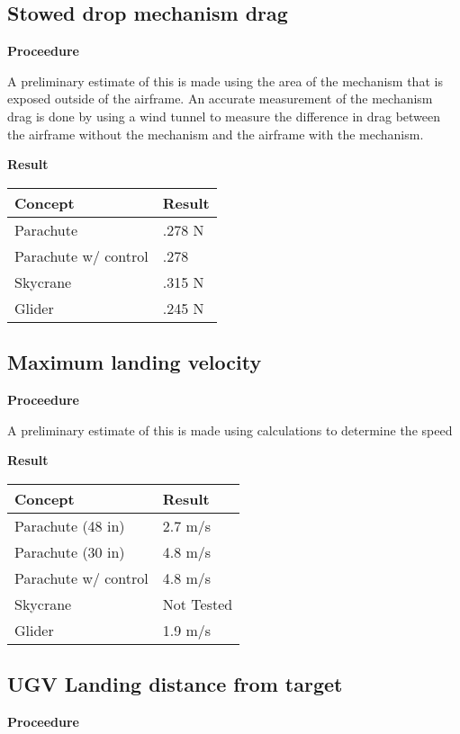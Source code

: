 \documentclass[]{auvsi_doc}
\begin{document}
	\subsection{Stowed drop mechanism drag}                                   
	\textbf{Proceedure}

	A preliminary estimate of this is made using the area of the mechanism that is exposed outside of the airframe. 
	An accurate measurement of the mechanism drag is done by using a wind tunnel to measure the difference in drag between the airframe without the mechanism and the airframe with the mechanism.
	
	\textbf{Result}
	
	\begin{tabular}{|l|l|}
		\hline
		\textbf{Concept}       & \textbf{Result} \\
		\hline
		Parachute              &         .278 N        \\
		Parachute w/ control   &    .278             \\
		Skycrane               &        .315 N         \\
		Glider                 &		.245 N		 \\
		\hline
	\end{tabular}

	\subsection{Maximum landing velocity}
	\textbf{Proceedure}
	
	A preliminary estimate of this is made using calculations to determine the speed 

	\textbf{Result}

	\begin{tabular}{|l|l|}
		\hline
		\textbf{Concept}       & \textbf{Result} \\
		\hline
		Parachute (48 in)              &        2.7 m/s         \\
		Parachute (30 in)		&	4.8 m/s\\
		Parachute w/ control   &                4.8 m/s \\
		Skycrane               &                 Not Tested\\
		Glider                 &			1.9 m/s	 \\
		\hline
	\end{tabular}

	\subsection{UGV Landing distance from target}
	\textbf{Proceedure}
\end{document}

